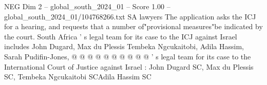 \begin{textsample}{NEG Dim 2 – global\_south\_2024\_01 – Score 1.00 – global\_south\_2024\_01/104768266.txt}
SA lawyers The application asks the ICJ for a hearing, and requests that a number of"provisional measures"be indicated by the court.
South Africa ' s legal team for its case to the ICJ against Israel includes John Dugard, Max du Plessis Tembeka Ngcukaitobi, Adila Hassim, Sarah Pudifin-Jones, @ @ @ @ @ @ @ @ @ @ ' s legal team for its case to the International Court of Justice against Israel : John Dugard SC, Max du Plessis SC, Tembeka Ngcukaitobi SCAdila Hassim SC

\end{textsample}
